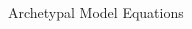 \begin{frame}{Archetypal Model Equations}
\begin{columns}
\begin{column}{.3 \textwidth}
\begin{figure}
            \end{figure}
        \end{column}
    \end{columns}
\end{frame}

